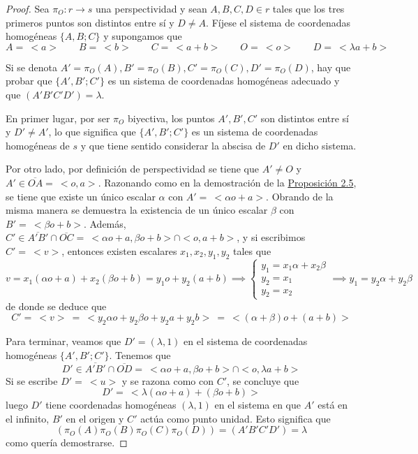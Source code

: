 \documentclass[12pt]{report}
\theoremstyle{definition}
\theoremstyle{definition}
\theoremstyle{remark}
\begin{document}
\begin{proof}
Sea $\pi_O \colon r \to s$ una perspectividad y sean $A,B,C,D \in r$ tales que los tres primeros puntos son distintos entre sí y $D \neq A$. Fíjese el sistema de coordenadas homogéneas $\{A,B;C\}$ y supongamos que 
\[A = \ <a> \qquad B = \ <b> \qquad C = \ <a+b> \qquad O = \ <o> \qquad D = \ <\lambda a +b>\]

Si se denota $A' = \pi_O(A), B' = \pi_O(B), C' = \pi_O(C), D' = \pi_O(D)$, hay que probar que $\{A',B';C'\}$ es un sistema de coordenadas homogéneas adecuado y que $(A'B'C'D') = \lambda$.

\vspace{2mm}
En primer lugar, por ser $\pi_O$ biyectiva, los puntos $A',B',C'$ son distintos entre sí y $D' \neq A'$, lo que significa que $\{A',B';C'\}$ es un sistema de coordenadas homogéneas de $s$ y que tiene sentido considerar la abscisa de $D'$ en dicho sistema.

\vspace{2mm}
Por otro lado, por definición de perspectividad se tiene que $A' \neq O$ y $A' \in \overline{OA} = \ <o,a>$. Razonando como en la demostración de la \hyperref[prop2.5.]{\color{blue}Proposición 2.5}, se tiene que existe un único escalar $\alpha$ con $A' = \ <\alpha o + a>$. Obrando de la misma manera se demuestra la existencia de un único escalar $\beta$ con $B' = \ <\beta o + b>$. Además, $C' \in \overline{A'B'} \cap \overline{OC} = \ <\alpha o + a, \beta o + b> \cap <o,a+b>$, y si escribimos $C' = \ <v>$, entonces existen escalares $x_1,x_2,y_1,y_2$ tales que
\[v = x_1(\alpha o + a) + x_2 (\beta o + b) = y_1 o +y_2(a+b) \implies \begin{cases}
    y_1 = x_1\alpha + x_2\beta \\
    y_2 = x_1 \\
    y_2 = x_2
\end{cases} \implies y_1 = y_2 \alpha + y_2 \beta\]
de donde se deduce que 
\[C' = \ <v> \ = \ < y_2\alpha o + y_2 \beta o + y_2 a + y_2 b > \ = \ <(\alpha + \beta)o + (a+b)> \]

Para terminar, veamos que $D' = (\lambda, 1)$ en el sistema de coordenadas homogéneas $\{A',B';C'\}$. Tenemos que \[D' \in \overline{A'B'} \cap \overline{OD} = \ <\alpha o +a, \beta o +b> \cap <o, \lambda a + b>\] Si se escribe $D' = \ <u>$ y se razona como con $C'$, se concluye que
\[D' = \ <\lambda (\alpha o + a) + (\beta o + b)>\]
luego $D'$ tiene coordenadas homogéneas $(\lambda, 1)$ en el sistema en que $A'$ está en el infinito, $B'$ en el origen y $C'$ actúa como punto unidad. Esto significa que 
\[(\pi_O(A)\pi_O(B)\pi_O(C)\pi_O(D)) = (A'B'C'D') = \lambda\]
como quería demostrarse.
\end{proof}
\end{document}
